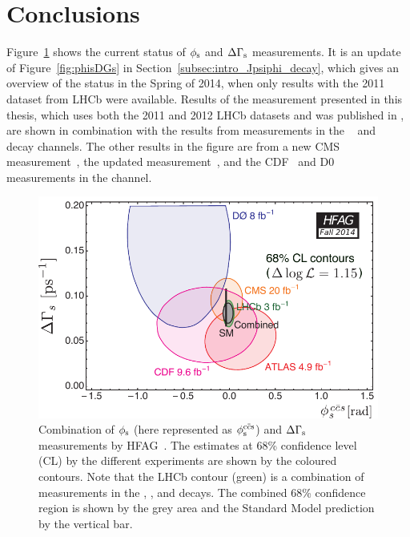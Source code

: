 \chapter*{Conclusions}
\chaptermark{}

Figure~\ref{fig:phisDGsNew} shows the current status of $\phi_\text{s}$ and $\Delta\Gamma_\text{s}$ measurements. It is an update of Figure~\ref{fig:phisDGs} in
Section~\ref{subsec:intro_Jpsiphi_decay}, which gives an overview of the status in the Spring of 2014, when only results with the 2011
dataset from LHCb were available. Results of the measurement presented in this thesis, which uses both the 2011 and 2012 LHCb datasets and
was published in \cite{LHCb-PAPER-2014-059}, are shown in combination with the results from measurements in the
\BstoJpsipipi~\cite{LHCb-PAPER-2014-019} and \BstoDspDsm~\cite{LHCb-PAPER-2014-051} decay channels. The other results in the figure are
from a new CMS measurement~\cite{CMS:2014jxa}, the updated \atlas{} measurement~\cite{Aad:2014cqa}, and the CDF~\cite{Aaltonen:2012ie} and
D0~\cite{Abazov:2011ry} measurements in the \BstoJpsiphi{} channel.
\begin{figure}[htb]
  \centering
  \includegraphics[width=\textwidth]{graphics/results/hfag_Fall2014_DGsphis-cmyk}
  \caption{Combination of $\phi_\text{s}$ (here represented as $\phisccs$) and $\Delta\Gamma_\text{s}$ measurements by HFAG~\cite{Amhis:2012bh}.
           The estimates at 68\% confidence level (CL) by the different experiments are shown by the coloured contours.
           Note that the LHCb contour (green) is a combination of measurements in the
           \BstoJpsiphi{}, \BstoJpsipipi{}, and \BstoDspDsm{} decays.
           The combined 68\% confidence region is shown by the grey area and the Standard Model prediction by the vertical bar.}
  \label{fig:phisDGsNew}
\end{figure}
